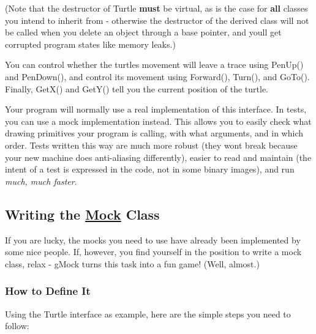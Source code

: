 (Note that the destructor of {\ttfamily Turtle} {\bfseries must} be virtual, as is the case for {\bfseries all} classes you intend to inherit from -\/ otherwise the destructor of the derived class will not be called when you delete an object through a base pointer, and you\textquotesingle{}ll get corrupted program states like memory leaks.)

You can control whether the turtle\textquotesingle{}s movement will leave a trace using {\ttfamily Pen\+Up()} and {\ttfamily Pen\+Down()}, and control its movement using {\ttfamily Forward()}, {\ttfamily Turn()}, and {\ttfamily Go\+To()}. Finally, {\ttfamily Get\+X()} and {\ttfamily Get\+Y()} tell you the current position of the turtle.

Your program will normally use a real implementation of this interface. In tests, you can use a mock implementation instead. This allows you to easily check what drawing primitives your program is calling, with what arguments, and in which order. Tests written this way are much more robust (they won\textquotesingle{}t break because your new machine does anti-\/aliasing differently), easier to read and maintain (the intent of a test is expressed in the code, not in some binary images), and run {\itshape much, much faster}.

\subsection*{Writing the \mbox{\hyperlink{classMock}{Mock}} Class}

If you are lucky, the mocks you need to use have already been implemented by some nice people. If, however, you find yourself in the position to write a mock class, relax -\/ g\+Mock turns this task into a fun game! (Well, almost.)

\subsubsection*{How to Define It}

Using the {\ttfamily Turtle} interface as example, here are the simple steps you need to follow\+:


